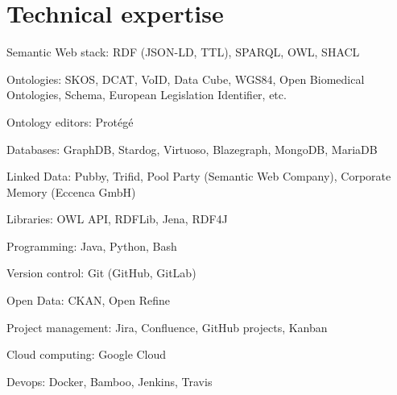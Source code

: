 \documentclass[11pt,fullpage]{article}
\renewenvironment{itemize}{
  \begin{list}{}{
    \setlength{\leftmargin}{1.5em}
  }
}{
  \end{list}
}
\begin{document}
\section*{Technical expertise}

\begin{itemize}
  \item Semantic Web stack: RDF (JSON-LD, TTL), SPARQL, OWL, SHACL
  \item Ontologies: SKOS, DCAT, VoID, Data Cube, WGS84, Open Biomedical Ontologies, Schema, European Legislation Identifier, etc.
  \item Ontology editors: Prot\'eg\'e 
  \item Databases: GraphDB, Stardog, Virtuoso, Blazegraph,  
  MongoDB,
  MariaDB
  \item Linked Data: Pubby, Trifid, Pool Party (Semantic Web Company), Corporate Memory (Eccenca GmbH)
  \item Libraries: OWL API, RDFLib, Jena, RDF4J
  \item Programming: Java, Python, Bash
  \item Version control: Git (GitHub, GitLab)
  \item Open Data: CKAN, Open Refine
  \item Project management: Jira, Confluence, GitHub projects, Kanban
  \item Cloud computing: Google Cloud %
  \item Devops: Docker, Bamboo, Jenkins, Travis
\end{itemize}
\end{document}
